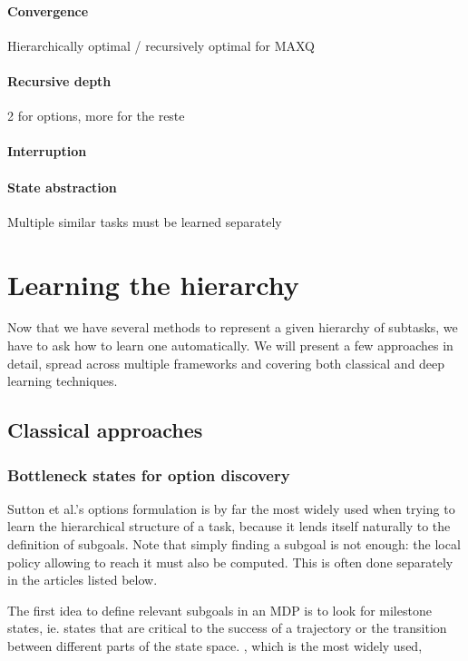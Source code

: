\documentclass{article}
\begin{document}
\paragraph{Convergence} Hierarchically optimal / recursively optimal for MAXQ

\paragraph{Recursive depth} 2 for options, more for the reste

\paragraph{Interruption}

\paragraph{State abstraction}

Multiple similar tasks must be learned separately

\section{Learning the hierarchy} \label{learning}

Now that we have several methods to represent a given hierarchy of subtasks, we have to ask how to learn one automatically. We will present a few approaches in detail, spread across multiple frameworks and covering both classical and deep learning techniques.

\subsection{Classical approaches}

\subsubsection{Bottleneck states for option discovery}

Sutton et al.'s options formulation \cite{sutton_between_1999} is by far the most widely used when trying to learn the hierarchical structure of a task, because it lends itself naturally to the definition of subgoals. Note that simply finding a subgoal is not enough: the local policy allowing to reach it must also be computed. This is often done separately in the articles listed below.

The first idea to define relevant subgoals in an MDP is to look for milestone states, ie. states that are critical to the success of a trajectory or the transition between different parts of the state space. , which is the most widely used, 
\end{document}
